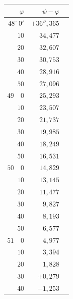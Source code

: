 \begin{center}
\begingroup\renewcommand{\arraystretch}{1.45}\setlength{\tabcolsep}{12pt}
\begin{tabular}[t]{|r|r|r|}
\hline
$\varphi$&$\psi-\varphi$&\\\hline\hline
$48^\circ\ 0'$&$+36''{,}365$&\raisebox{-.7\baselineskip}{\small$1{,}888$}\\
$10$&$34{,}477$&\raisebox{-.7\baselineskip}{\small$1{,}870$}\\
$20$&$32{,}607$&\raisebox{-.7\baselineskip}{\small$1{,}854$}\\
$30$&$30{,}753$&\raisebox{-.7\baselineskip}{\small$1{,}837$}\\
$40$&$28{,}916$&\raisebox{-.7\baselineskip}{\small$1{,}820$}\\
$50$&$27{,}096$&\raisebox{-.7\baselineskip}{\small$1{,}803$}\\
$49\quad0$&$25{,}293$&\raisebox{-.7\baselineskip}{\small$1{,}786$}\\
$10$&$23{,}507$&\raisebox{-.7\baselineskip}{\small$1{,}770$}\\
$20$&$21{,}737$&\raisebox{-.7\baselineskip}{\small$1{,}752$}\\
$30$&$19{,}985$&\raisebox{-.7\baselineskip}{\small$1{,}736$}\\
$40$&$18{,}249$&\raisebox{-.7\baselineskip}{\small$1{,}718$}\\
$50$&$16{,}531$&\raisebox{-.7\baselineskip}{\small$1{,}702$}\\
$50\quad0$&$14{,}829$&\raisebox{-.7\baselineskip}{\small$1{,}684$}\\
$10$&$13{,}145$&\raisebox{-.7\baselineskip}{\small$1{,}668$}\\
$20$&$11{,}477$&\raisebox{-.7\baselineskip}{\small$1{,}650$}\\
$30$&$9{,}827$&\raisebox{-.7\baselineskip}{\small$1{,}634$}\\
$40$&$8{,}193$&\raisebox{-.7\baselineskip}{\small$1{,}616$}\\
$50$&$6{,}577$&\raisebox{-.7\baselineskip}{\small$1{,}600$}\\
$51\quad0$&$4{,}977$&\raisebox{-.7\baselineskip}{\small$1{,}583$}\\
$10$&$3{,}394$&\raisebox{-.7\baselineskip}{\small$1{,}566$}\\
$20$&$1{,}828$&\raisebox{-.7\baselineskip}{\small$1{,}549$}\\
$30$&$+0{,}279$&\raisebox{-.7\baselineskip}{\small$1{,}532$}\\
$40$&$-1{,}253$&\raisebox{-.7\baselineskip}{\small$1{,}516$}\\

\end{tabular}
\end{center}
